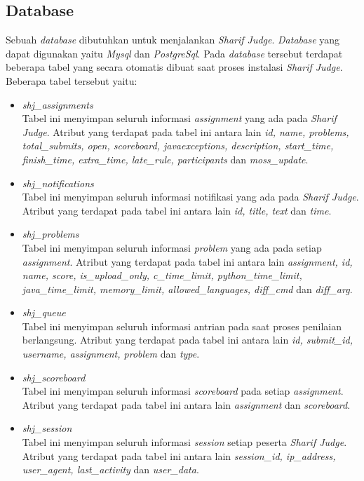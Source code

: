 \subsection{Database}
Sebuah \textit{database} dibutuhkan untuk menjalankan \textit{Sharif Judge}. \textit{Database} yang dapat digunakan yaitu \textit{Mysql} dan \textit{PostgreSql}. Pada \textit{database} tersebut terdapat beberapa tabel yang secara otomatis dibuat saat proses instalasi \textit{Sharif Judge}. Beberapa tabel tersebut yaitu:
\begin{itemize}
	\item \textit{shj\_assignments} \\
	Tabel ini menyimpan seluruh informasi \textit{assignment} yang ada pada \textit{Sharif Judge}. Atribut yang terdapat pada tabel ini antara lain \textit{id, name, problems, total\_submits, open, scoreboard, javaexceptions, description, start\_time, finish\_time, extra\_time, late\_rule, participants} dan \textit{moss\_update}.
	\item \textit{shj\_notifications} \\
	Tabel ini menyimpan seluruh informasi notifikasi yang ada pada \textit{Sharif Judge}. Atribut yang terdapat pada tabel ini antara lain \textit{id, title, text} dan \textit{time}.
	\item \textit{shj\_problems} \\
	Tabel ini menyimpan seluruh informasi \textit{problem} yang ada pada setiap \textit{assignment}. Atribut yang terdapat pada tabel ini antara lain \textit{assignment, id, name, score, is\_upload\_only, c\_time\_limit, python\_time\_limit, java\_time\_limit, memory\_limit, allowed\_languages, diff\_cmd} dan \textit{diff\_arg}. 
	\item \textit{shj\_queue} \\
	Tabel ini menyimpan seluruh informasi antrian pada saat proses penilaian berlangsung. Atribut yang terdapat pada tabel ini antara lain \textit{id, submit\_id, username, assignment, problem} dan \textit{type}.
	\item \textit{shj\_scoreboard} \\
	Tabel ini menyimpan seluruh informasi \textit{scoreboard} pada setiap \textit{assignment}. Atribut yang terdapat pada tabel ini antara lain \textit{assignment} dan \textit{scoreboard}.
	\item \textit{shj\_session} \\
	Tabel ini menyimpan seluruh informasi \textit{session} setiap peserta \textit{Sharif Judge}. Atribut yang terdapat pada tabel ini antara lain \textit{session\_id, ip\_address, user\_agent, last\_activity} dan \textit{user\_data}.

\end{itemize}
